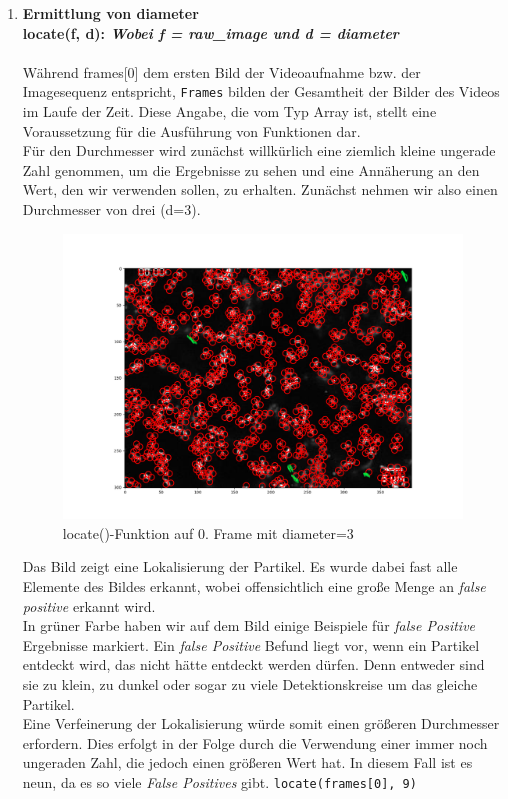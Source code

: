 	\begin{enumerate}
    			\item {\large \textbf{Ermittlung von diameter}}\\
    			\textbf{locate(f, d): \textit{Wobei f = raw\_image und d = diameter}} \\ \\
    			 Während frames[0] dem ersten Bild der Videoaufnahme bzw. der Imagesequenz entspricht, \texttt{Frames} bilden der Gesamtheit der Bilder des Videos im Laufe der Zeit.  Diese Angabe, die vom Typ Array ist, stellt eine Voraussetzung für die Ausführung von Funktionen dar. \\
    			 Für den Durchmesser wird zunächst willkürlich eine ziemlich kleine ungerade Zahl genommen, um die Ergebnisse zu sehen und eine Annäherung an den Wert, den wir verwenden sollen, zu erhalten. Zunächst nehmen wir also einen Durchmesser von drei (d=3).  
    			 
\begin{figure}[H]
    \centering
    \includegraphics[scale=0.35]{Grafiken/trackpyBilder/locate(f0, diameter=3).png}
    \caption{locate()-Funktion auf 0. Frame mit diameter=3}
    \label{fig:kap3_d=3}
\end{figure} 

Das Bild zeigt eine Lokalisierung der Partikel. Es wurde dabei fast alle Elemente des Bildes erkannt, wobei offensichtlich eine große Menge an \textit{\gls{false positive}} erkannt wird.\\
In grüner Farbe haben wir auf dem Bild einige Beispiele für \textit{false Positive} Ergebnisse markiert. 
Ein \textit{false Positive} Befund liegt vor, wenn ein Partikel entdeckt wird, das nicht hätte entdeckt werden dürfen. Denn entweder sind sie zu klein, zu dunkel oder sogar zu viele Detektionskreise um das gleiche Partikel.  
\\
Eine Verfeinerung der Lokalisierung würde somit einen größeren Durchmesser erfordern. Dies erfolgt in der Folge durch die Verwendung einer immer noch ungeraden Zahl, die jedoch einen größeren Wert hat. In diesem Fall ist es neun, da es so viele \textit{False Positives} gibt. 
\texttt{locate(frames[0], 9)}


\end{enumerate}
